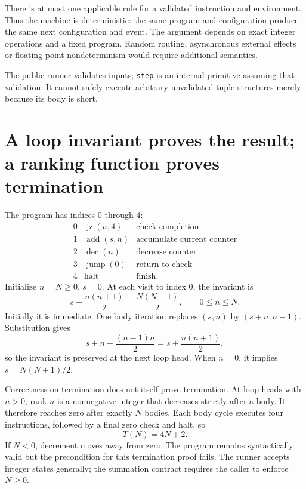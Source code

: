 
There is at most one applicable rule for a validated instruction and environment.
Thus the machine is deterministic: the same program and configuration produce
the same next configuration and event. The argument depends on exact integer
operations and a fixed program. Random routing, asynchronous external effects
or floating-point nondeterminism would require additional semantics.

The public runner validates inputs; \texttt{step} is an internal primitive
assuming that validation. It cannot safely execute arbitrary unvalidated tuple
structures merely because its body is short.

\section{A loop invariant proves the result; a ranking function proves termination}
The program has indices 0 through 4:
\[
\begin{array}{rll}
0&\operatorname{jz}(n,4)&\text{check completion}\\
1&\operatorname{add}(s,n)&\text{accumulate current counter}\\
2&\operatorname{dec}(n)&\text{decrease counter}\\
3&\operatorname{jump}(0)&\text{return to check}\\
4&\operatorname{halt}&\text{finish}.
\end{array}
\]
Initialize $n=N\geq0$, $s=0$. At each visit to index 0, the invariant is
\begin{equation}
 s+\frac{n(n+1)}2=\frac{N(N+1)}2,\qquad 0\leq n\leq N.
 \label{eq:sum}
\end{equation}
Initially it is immediate. One body iteration replaces $(s,n)$ by
$(s+n,n-1)$. Substitution gives
\[
 s+n+\frac{(n-1)n}{2}=s+\frac{n(n+1)}2,
\]
so the invariant is preserved at the next loop head.
When $n=0$, it implies $s=N(N+1)/2$.


Correctness on termination does not itself prove termination. At loop heads
with $n>0$, rank $n$ is a nonnegative integer that decreases strictly after a
body. It therefore reaches zero after exactly $N$ bodies.
Each body cycle executes four instructions, followed by a final zero check
and halt, so
\begin{equation}
 T(N)=4N+2.
 \label{eq:steps}
\end{equation}
If $N<0$, decrement moves away from zero. The program remains syntactically
valid but the precondition for this termination proof fails.
The runner accepts integer states generally; the summation contract requires
the caller to enforce $N\geq0$.

